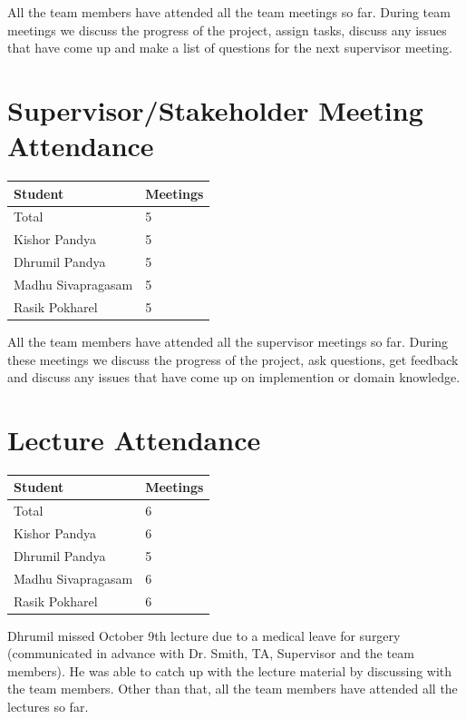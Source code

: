\documentclass{article}
\begin{document}
All the team members have attended all the team meetings so far. During team meetings we discuss the progress of the project, assign tasks, discuss any issues that have come up and make a list of questions for the next supervisor meeting.

\section{Supervisor/Stakeholder Meeting Attendance}

\begin{table}[H]
\centering
\begin{tabular}{ll}
\toprule
\textbf{Student} & \textbf{Meetings}\\
\midrule
Total & 5\\
Kishor Pandya & 5\\
Dhrumil Pandya & 5\\
Madhu Sivapragasam & 5\\
Rasik Pokharel & 5\\
\bottomrule
\end{tabular}
\end{table}

All the team members have attended all the supervisor meetings so far. During these meetings we discuss the progress of the project, ask questions, get feedback and discuss any issues that have come up on implemention or domain knowledge.

\section{Lecture Attendance}

\begin{table}[H]
\centering
\begin{tabular}{ll}
\toprule
\textbf{Student} & \textbf{Meetings}\\
\midrule
Total & 6\\
Kishor Pandya & 6\\
Dhrumil Pandya & 5\\
Madhu Sivapragasam & 6\\
Rasik Pokharel & 6\\
\bottomrule
\end{tabular}
\end{table}

Dhrumil missed October 9th lecture due to a medical leave for surgery (communicated in advance with Dr. Smith, TA, Supervisor and the team members). He was able to catch up with the lecture material by discussing with the team members. Other than that, all the team members have attended all the lectures so far.
\end{document}
